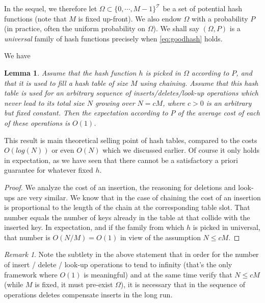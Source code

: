 \documentclass[12pt]{article}
\theoremstyle{plain}
\newtheorem{lemma}{Lemma}
\theoremstyle{remark}
\newtheorem*{remark}{Remark}
\begin{document}
In the sequel, we therefore let $\Omega \subset \{0,\cdots, M-1\}^\mathcal{T}$
be a set of potential hash functions (note that $M$ is fixed up-front). We also 
endow $\Omega$ with a probability $P$ (in practice, often the uniform
probability on $\Omega$). We shall say $(\Omega,P)$ is a {\it universal} family
of hash functions precisely
when \eqref{eq:goodhash} holds.

\medskip
We have

\begin{lemma}\label{lem:O1}
Assume that the hash function $h$ is picked in $\Omega$ according to
$P$, and that it is used to fill a hash table of size $M$ using chaining. 
Assume that this hash table is used for an arbitrary sequence of 
inserts/deletes/look-up operations which never lead to its total size 
$N$ growing over $N = cM$, where $c >0$ is an arbitrary but fixed
constant. Then the expectation according to $P$ of the average cost of 
each of these operations is $O(1)$. 
\end{lemma}

This result is main theoretical selling point of hash tables, compared to 
the costs $O(log(N))$ or even $O(N)$ which we discussed earlier. Of course
it only holds in expectation, as we have seen that there cannot be a
satisfactory a priori guarantee for whatever fixed $h$. 

\begin{proof}
We analyze the cost of an insertion, the reasoning for deletions and look-ups
are very similar. We know that in the case of chaining the cost of an insertion is
proportional to the length of the chain at the corresponding table slot. That number equals 
the number of keys already in the table at that collide with the inserted key.
In expectation, and if the family from which $h$ is picked in universal, that
number is $O(N/M) = O(1)$ in view of the assumption $N \leq cM.$  
\end{proof}

\begin{remark} Note the subtlety in the above statement that in order for the number of
insert / delete / look-up operations to tend to infinity (that's the only 
framework where $O(1)$ is meaningful) and at the same time verify that $N \leq cM$ 
(while $M$ is fixed, it must pre-exist $\Omega$), it is necessary that
in the sequence of operations deletes compensate inserts in the long run. 
\end{remark}
\end{document}
